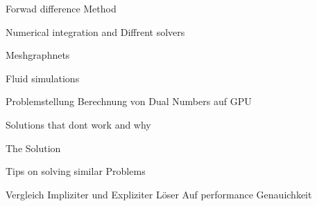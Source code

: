 

Forwad difference Method

Numerical integration and Diffrent solvers

Meshgraphnets 

Fluid simulations




Problemstellung Berechnung von Dual Numbers auf GPU

Solutions that dont work and why

The Solution

Tips on solving similar Problems


Vergleich Impliziter und Expliziter Löser 
Auf performance 
Genauichkeit




